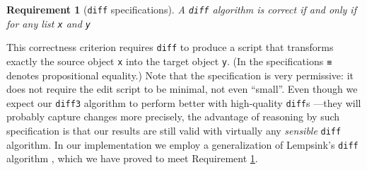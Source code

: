 \documentclass{sigplanconf}
\theoremstyle{plain}
\newtheorem{prop}{Proposition}
\newtheorem{req}{Requirement}
\begin{document}
\begin{req}[\texttt{diff} specifications]
  \label{req:diff-specs}
  A \texttt{diff} algorithm is correct if and only if for any list
  \texttt{x} and \texttt{y} 
\end{req}
%
This correctness criterion requires \texttt{diff} to produce a script
that transforms exactly the source object \texttt{x} into the target
object \texttt{y}.  (In the specifications \texttt{≡} denotes
propositional equality.)
%
Note that the specification is very permissive: it does not require 
the edit script to be minimal, not even ``small''.
%
Even though we expect our \texttt{diff3} algorithm to perform better
with high-quality \texttt{diff}s ---they will probably capture changes
more precisely, the advantage of reasoning by such specification is
that our results are still valid with virtually any \emph{sensible}
\texttt{diff} algorithm.
%
In our implementation we employ a generalization of Lempsink's
\texttt{diff} algorithm \cite{Lemp09}, which we have proved to meet
Requirement \ref{req:diff-specs}.
\end{document}
